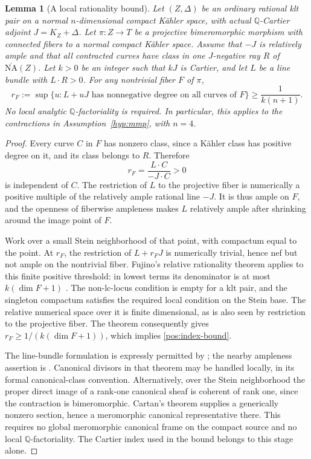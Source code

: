 \documentclass[11pt,letterpaper]{article}
\newtheorem{lemma}[theorem]{Lemma}
\theoremstyle{definition}
\theoremstyle{remark}
\begin{document}
\begin{lemma}[A local rationality bound]\label{pos:rationality}
Let \((Z,\Delta)\) be an ordinary rational klt pair on a normal
\(n\)-dimensional compact Kähler space, with actual \(\mathbb{Q}\)-Cartier
adjoint \(J=K_Z+\Delta\). Let \(\pi:Z\to T\) be a projective
bimeromorphic morphism with connected fibers to a normal compact
Kähler space. Assume that \(-J\) is relatively ample and that all
contracted curves have class in one \(J\)-negative ray \(R\) of
\(\overline{\mathrm{NA}}(Z)\). Let \(k>0\) be an integer such that \(kJ\) is Cartier,
and let \(L\) be a line bundle with \(L\cdot R>0\). For any
nontrivial fiber \(F\) of \(\pi\),
\begin{equation}\label{pos:index-bound}
 r_F:=\sup\{u:L+uJ\text{ has nonnegative degree on all curves of }F\}
 \geq\frac{1}{k(n+1)}.
\end{equation}
No local analytic \(\mathbb{Q}\)-factoriality is required.
In particular, this applies to the contractions in
Assumption~\ref{hyp:mmp}, with \(n=4\).
\end{lemma}

\begin{proof}
Every curve \(C\) in \(F\) has nonzero class, since a Kähler class
has positive degree on it, and its class belongs to \(R\). Therefore
\[
 r_F=\frac{L\cdot C}{-J\cdot C}>0
\]
is independent of \(C\). The restriction of \(L\) to the projective
fiber is numerically a positive multiple of the relatively ample
rational line \(-J\). It is thus ample on \(F\), and the openness of
fiberwise ampleness makes \(L\) relatively ample after shrinking around
the image point of \(F\).

Work over a small Stein neighborhood of that point, with compactum
equal to the point. At \(r_F\), the restriction of \(L+r_FJ\) is
numerically trivial, hence nef but not ample on the nontrivial fiber.
Fujino's relative rationality theorem applies to this finite positive
threshold: in lowest terms its denominator is at most
\(k(\dim F+1)\) \cite[Theorem~4.3.1]{FujinoAnalyticCone}. The
non-lc-locus condition is empty for a klt pair, and the singleton
compactum satisfies the required local condition on the Stein base.
The relative numerical space over it is finite dimensional, as is also
seen by restriction to the projective fiber. The theorem consequently
gives \(r_F\geq1/(k(\dim F+1))\), which implies
\eqref{pos:index-bound}.

The line-bundle formulation is expressly permitted by
\cite[Remark~4.3.4]{FujinoAnalyticCone}; the nearby ampleness assertion
is \cite[Lemma~2.2.4]{FujinoAnalyticCone}. Canonical divisors in that
theorem may be handled locally, in its formal canonical-class
convention. Alternatively, over the Stein neighborhood the proper
direct image of a rank-one canonical sheaf is coherent of rank one,
since the contraction is bimeromorphic. Cartan's theorem supplies a
generically nonzero section, hence a meromorphic canonical
representative there. This requires no global meromorphic canonical
frame on the compact source and no local \(\mathbb{Q}\)-factoriality. The
Cartier index used in the bound belongs to this stage alone.
\end{proof}
\end{document}
